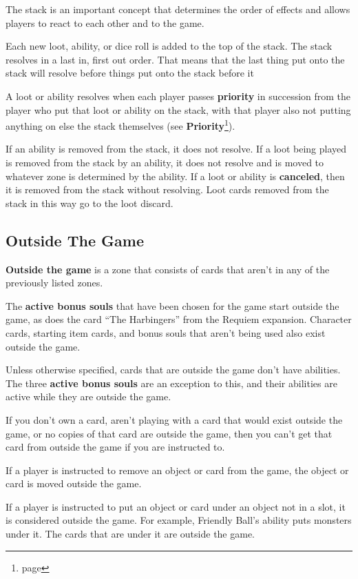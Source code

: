 \documentclass[10pt, a4paper, twoside]{article} %
\begin{document}
    The stack is an important concept that determines the order of effects and allows players to react to each other and to the game.

    Each new loot, ability, or dice roll is added to the top of the stack. The stack resolves in a last in, first out order. That means that the last thing put onto the stack will resolve before things put onto the stack before it

    A loot or ability resolves when each player passes \textbf{priority} in succession from the player who put that loot or ability on the stack, with that player also not putting anything on else the stack themselves (see \textbf{Priority}\footnote{page \pageref{priority}}).

    If an ability is removed from the stack, it does not resolve. If a loot being played is removed from the stack by an ability, it does not resolve and is moved to whatever zone is determined by the ability. If a loot or ability is \textbf{canceled}, then it is removed from the stack without resolving. Loot cards removed from the stack in this way go to the loot discard.

    \subsection{Outside The Game}
    \textbf{Outside the game} is a zone that consists of cards that aren’t in any of the previously listed zones.

    The \textbf{active bonus souls} that have been chosen for the game start outside the game, as does the card “The Harbingers” from the Requiem expansion. Character cards, starting item cards, and bonus souls that aren’t being used also exist outside the game.

    Unless otherwise specified, cards that are outside the game don’t have abilities. The three \textbf{active bonus souls} are an exception to this, and their abilities are active while they are outside the game.

    If you don’t own a card, aren’t playing with a card that would exist outside the game, or no copies of that card are outside the game, then you can’t get that card from outside the game if you are instructed to.

    If a player is instructed to remove an object or card from the game, the object or card is moved outside the game.

    If a player is instructed to put an object or card under an object not in a slot, it is considered outside the game. For example, Friendly Ball’s ability puts monsters under it. The cards that are under it are outside the game.
\end{document}
